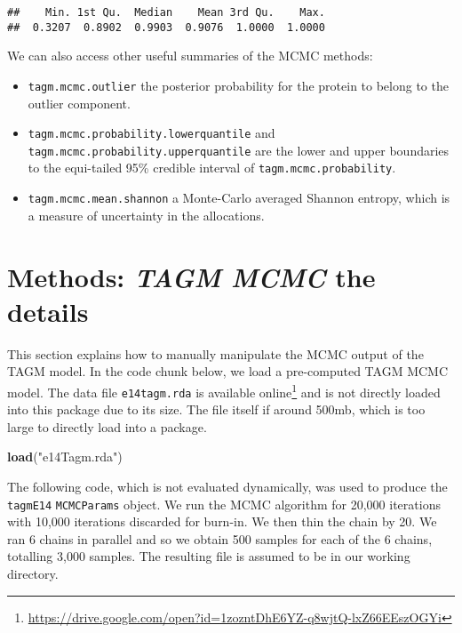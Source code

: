 \documentclass[9pt,a4paper,]{extarticle}
\newenvironment{Shaded}{\begin{snugshade}}{\end{snugshade}}
\newcommand{\KeywordTok}[1]{\textcolor[rgb]{0.13,0.29,0.53}{\textbf{#1}}}
\newcommand{\NormalTok}[1]{#1}
\newcommand{\StringTok}[1]{\textcolor[rgb]{0.31,0.60,0.02}{#1}}
\begin{document}
\begin{verbatim}
##    Min. 1st Qu.  Median    Mean 3rd Qu.    Max. 
##  0.3207  0.8902  0.9903  0.9076  1.0000  1.0000
\end{verbatim}

We can also access other useful summaries of the MCMC methods:

\begin{itemize}
\item
  \texttt{tagm.mcmc.outlier} the posterior probability for the protein
  to belong to the outlier component.
\item
  \texttt{tagm.mcmc.probability.lowerquantile} and \texttt{tagm.mcmc.probability.upperquantile}
  are the lower and upper boundaries to the equi-tailed 95\% credible interval
  of \texttt{tagm.mcmc.probability}.
\item
  \texttt{tagm.mcmc.mean.shannon} a Monte-Carlo averaged Shannon entropy,
  which is a measure of uncertainty in the allocations.
\end{itemize}

\hypertarget{methods-tagm-mcmc-the-details}{%
\section{\texorpdfstring{Methods: \emph{TAGM MCMC} the details}{Methods: TAGM MCMC the details}}\label{methods-tagm-mcmc-the-details}}

This section explains how to manually manipulate the MCMC output of
the TAGM model. In the code chunk below, we load a pre-computed
TAGM MCMC model. The data file \texttt{e14tagm.rda} is available online\footnote{\url{https://drive.google.com/open?id=1zozntDhE6YZ-q8wjtQ-lxZ66EEszOGYi}}
and is not directly loaded into this package due to its size. The file
itself if around 500mb, which is too large to directly load into a package.

\begin{Shaded}
\begin{Highlighting}[]
\KeywordTok{load}\NormalTok{(}\StringTok{"e14Tagm.rda"}\NormalTok{)}
\end{Highlighting}
\end{Shaded}

The following code, which is not evaluated dynamically, was used to
produce the \texttt{tagmE14} \texttt{MCMCParams} object. We run the MCMC algorithm
for 20,000 iterations with 10,000 iterations discarded for burn-in. We
then thin the chain by 20. We ran 6 chains in parallel and so we
obtain 500 samples for each of the 6 chains, totalling 3,000
samples. The resulting file is assumed to be in our working directory.
\end{document}
